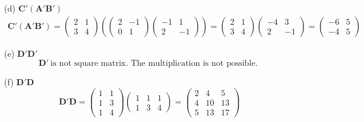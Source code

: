 \documentclass{article}
\begin{document}
\begin{enumerate}
\begin{enumerate}
            \item[(d)] $\mathbf{C}'(\mathbf{A}'\mathbf{B}')$
            \begin{align*}
                \mathbf{C}'(\mathbf{A}'\mathbf{B}')
                = \begin{pmatrix}2 &1\\3 &4\end{pmatrix} 
                  \left( \begin{pmatrix}2 &-1\\0 &1\end{pmatrix}
                  \begin{pmatrix}-1 &1\\2 &-1\end{pmatrix} \right)
                = \begin{pmatrix}2 &1\\3 &4\end{pmatrix} 
                  \begin{pmatrix}-4 &3\\2 &-1\end{pmatrix}
                = \begin{pmatrix}-6 &5\\-4 &5\end{pmatrix}
            \end{align*}
            
            \item[(e)] $\mathbf{D}'\mathbf{D}'$
            $$ \mathbf{D}'\ \textrm{is not square matrix. The multiplication is not possible. }$$
            
            \item[(f)] $\mathbf{D}'\mathbf{D}$
            \begin{equation*}
                \mathbf{D}'\mathbf{D}
                = \begin{pmatrix}1 &1\\1 &3\\1 &4\end{pmatrix}
                  \begin{pmatrix}1 &1 &1\\1 &3 &4\end{pmatrix}
                = \begin{pmatrix}2 &4 &5\\4 &10 &13\\5 &13 &17\end{pmatrix}
            \end{equation*}
        \end{enumerate}
        

\end{enumerate}
\end{document}
